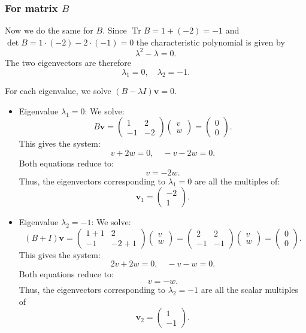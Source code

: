 \documentclass[addpoints, 12pt,answers]{exam}
\begin{document}
\begin{questions}
\begin{solution}
\subsubsection*{For matrix $B$}
Now we do the same for $B$.
Since $\operatorname{Tr} B = 1 + (-2) = -1$ and $\det B = 1 \cdot (-2) - 2 \cdot (-1) = 0$
the characteristic polynomial is given by
\[ \lambda^2 - \lambda = 0. \]
The two eigenvectors are therefore
\[ \lambda_1 = 0, \quad \lambda_2 = -1. \]

For each eigenvalue, we solve $(B - \lambda I)\mathbf{v} = 0$.
\begin{itemize}
\item {Eigenvalue $\lambda_1 = 0$:}
We solve:
\[ B \mathbf{v} = \begin{pmatrix} 1 & 2 \\ -1 & -2 \end{pmatrix} \begin{pmatrix} v \\ w \end{pmatrix} = \begin{pmatrix} 0 \\ 0 \end{pmatrix}. \]
This gives the system:
\[ v + 2w = 0, \quad -v - 2w = 0. \]
Both equations reduce to:
\[ v = -2w. \]
Thus, the eigenvectors corresponding to $\lambda_1 = 0$ are all the multiples of:
\[ \mathbf{v}_1 = \begin{pmatrix} -2 \\ 1 \end{pmatrix}. \]

\item {Eigenvalue $\lambda_2 = -1$:}
We solve:
\[ (B + I) \mathbf{v} = \begin{pmatrix} 1 + 1 & 2 \\ -1 & -2 + 1 \end{pmatrix} \begin{pmatrix} v \\ w \end{pmatrix} = \begin{pmatrix} 2 & 2 \\ -1 & -1 \end{pmatrix} \begin{pmatrix} v \\ w \end{pmatrix} = \begin{pmatrix} 0 \\ 0 \end{pmatrix}. \]
This gives the system:
\[ 2v + 2w = 0, \quad -v - w = 0. \]
Both equations reduce to:
\[ v = -w. \]
Thus, the eigenvectors corresponding to $\lambda_2 = -1$ are all the scalar multiples of
\[ \mathbf{v}_2 = \begin{pmatrix} 1 \\ -1 \end{pmatrix}. \]
\end{itemize}
\end{solution}


\end{questions}
\end{document}
